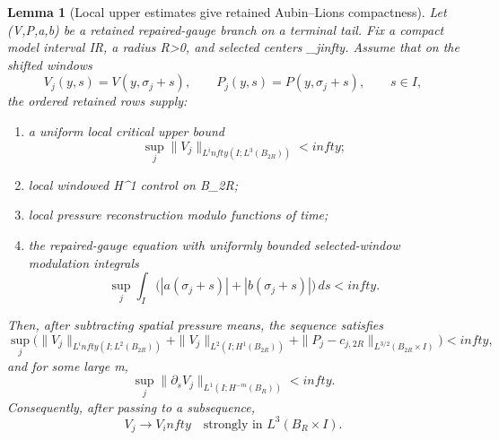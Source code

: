 \documentclass[11pt]{amsart}
\def\({}%
\def\){}%
\def\mathbb#1{#1}%
\def\infty{infty}%
\theoremstyle{plain}
\newtheorem{lemma}[lemma]{Lemma}
\theoremstyle{definition}
\theoremstyle{remark}
\begin{document}
\begin{lemma}[Local upper estimates give retained Aubin--Lions compactness]
\label{lem:c5-retained-upper-estimates-aubin-lions}
Let \((V,P,a,b)\) be a retained repaired-gauge branch on a terminal tail.  Fix
a compact model interval \(I\Subset\mathbb R\), a radius \(R>0\), and selected
centers \(\sigma_j\to\infty\).  Assume that on the shifted windows
\[
  V_j(y,s)=V(y,\sigma_j+s),\qquad
  P_j(y,s)=P(y,\sigma_j+s),
  \qquad s\in I,
\]
the ordered retained rows supply:
\begin{enumerate}[label=\textup{(\roman*)}]
\item a uniform local critical upper bound
\[
  \sup_j\|V_j\|_{L^\infty(I;L^3(B_{2R}))}<\infty;
\]
\item local windowed \(H^1\) control on \(B_{2R}\);
\item local pressure reconstruction modulo functions of time;
\item the repaired-gauge equation with uniformly bounded selected-window
modulation integrals
\[
  \sup_j\int_I\bigl(|a(\sigma_j+s)|+|b(\sigma_j+s)|\bigr)\,ds<\infty .
\]
\end{enumerate}
Then, after subtracting spatial pressure means, the sequence satisfies
\[
  \sup_j\Big(
  \|V_j\|_{L^\infty(I;L^2(B_{2R}))}
  +\|V_j\|_{L^2(I;H^1(B_{2R}))}
  +\|P_j-c_{j,2R}\|_{L^{3/2}(B_{2R}\times I)}
  \Big)<\infty,
\]
and for some large \(m\),
\[
  \sup_j\|\partial_sV_j\|_{L^1(I;H^{-m}(B_R))}<\infty .
\]
Consequently, after passing to a subsequence,
\[
  V_j\to V_\infty
  \quad\text{strongly in }L^3(B_R\times I).
\]
\end{lemma}
\end{document}
